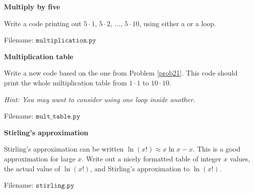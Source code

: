 
\begin{Problem}{\textbf{Multiply by five}} \label{prob21}

\noindent Write a code printing out $5\cdot 1$, $5\cdot 2$, ..., $5\cdot 10$, using either
a  or a  loop.

Filename: $\texttt{multiplication.py}$
\end{Problem}


\begin{Problem}{\textbf{Multiplication table}}\label{prob22}

\noindent Write a new code based on the one from Problem \ref{prob21}. This code should print the
whole miltiplication table from $1\cdot 1$ to $10 \cdot 10$.

\emph{Hint: You may want to consider using one loop inside another.}

Filename: $\texttt{mult\_table.py}$
\end{Problem}

\begin{Problem}{\textbf{Stirling's approximation}}\label{prob23}

\noindent Stirling's approximation can be written $\ln (x!) \approx x\ln x - x$. This is a
good approximation for large $x$. Write out a nicely formatted table of integer
$x$ values, the actual value of $\ln (x!)$, and Stirling's approximation to $\ln (x!)$.

Filename: $\texttt{stirling.py}$
\end{Problem}


